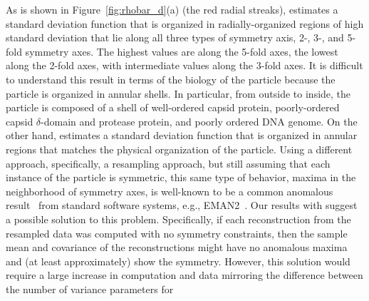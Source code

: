As is shown in Figure~\ref{fig:rhobar_d}(a) (the red radial streaks),
{\heterosymparticles} estimates a standard deviation function that is
organized in radially-organized regions of high standard deviation that
lie along all three types of symmetry axis, 2-, 3-, and 5-fold symmetry
axes.
The highest values are along the 5-fold axes, the lowest along the 2-fold
axes, with intermediate values along the 3-fold axes.
It is difficult to understand this result in terms of the biology of the
particle because the particle is organized in annular shells.
In particular, from outside to inside, the {\withpro} particle is composed
of a shell of well-ordered capsid protein, poorly-ordered capsid
$\delta$-domain and protease protein, and poorly ordered DNA genome.
On the other hand, {\heterosymstatistics} estimates a standard deviation
function that is organized in annular regions that matches the physical
organization of the particle.
Using a different approach, specifically, a resampling approach, but still
assuming that each instance of the particle is symmetric, this same type of
behavior, maxima in the neighborhood of symmetry axes, is well-known to be
a common anomalous result~\cite[p.~173]{Ludtke.MethodsEnzymology.2016} from
standard software systems, e.g.,
EMAN2~\cite{TangPengBaldwinMannJiangReesLudtkeJSB2007EMAN2}.
Our results with {\heterosymstatistics} suggest a possible solution to this
problem.
Specifically, if each reconstruction from the resampled data was computed
with no symmetry constraints, then the sample mean and covariance of the
reconstructions might have no anomalous maxima and (at least approximately)
show the symmetry.
However, this solution would require a large increase in computation and
data mirroring the difference between the number of variance parameters for
